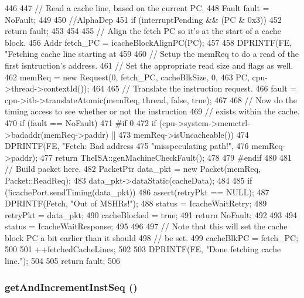 \begin{DoxyCode}
446 {
447     // Read a cache line, based on the current PC.
448     Fault fault = NoFault;
449 
450     //AlphaDep
451     if (interruptPending && (PC & 0x3)) {
452         return fault;
453     }
454 
455     // Align the fetch PC so it's at the start of a cache block.
456     Addr fetch_PC = icacheBlockAlignPC(PC);
457 
458     DPRINTF(FE, "Fetching cache line starting at %
459 
460     // Setup the memReq to do a read of the first isntruction's address.
461     // Set the appropriate read size and flags as well.
462     memReq = new Request(0, fetch_PC, cacheBlkSize, 0,
463                          PC, cpu->thread->contextId());
464 
465     // Translate the instruction request.
466     fault = cpu->itb->translateAtomic(memReq, thread, false, true);
467 
468     // Now do the timing access to see whether or not the instruction
469     // exists within the cache.
470     if (fault == NoFault) {
471 #if 0
472         if (cpu->system->memctrl->badaddr(memReq->paddr) ||
473             memReq->isUncacheable()) {
474             DPRINTF(FE, "Fetch: Bad address %
475                     "misspeculating path!",
476                     memReq->paddr);
477             return TheISA::genMachineCheckFault();
478         }
479 #endif
480 
481         // Build packet here.
482         PacketPtr data_pkt = new Packet(memReq, Packet::ReadReq);
483         data_pkt->dataStatic(cacheData);
484 
485         if (!icachePort.sendTiming(data_pkt)) {
486             assert(retryPkt == NULL);
487             DPRINTF(Fetch, "Out of MSHRs!\n");
488             status = IcacheWaitRetry;
489             retryPkt = data_pkt;
490             cacheBlocked = true;
491             return NoFault;
492         }
493 
494         status = IcacheWaitResponse;
495     }
496 
497     // Note that this will set the cache block PC a bit earlier than it should
498     // be set.
499     cacheBlkPC = fetch_PC;
500 
501     ++fetchedCacheLines;
502 
503     DPRINTF(FE, "Done fetching cache line.\n");
504 
505     return fault;
506 }
\end{DoxyCode}
\hypertarget{classFrontEnd_ace86a0dff0fe9648b7221e3a98fb4533}{
\subsubsection[{getAndIncrementInstSeq}]{ getAndIncrementInstSeq ()}}
\label{classFrontEnd_ace86a0dff0fe9648b7221e3a98fb4533}



